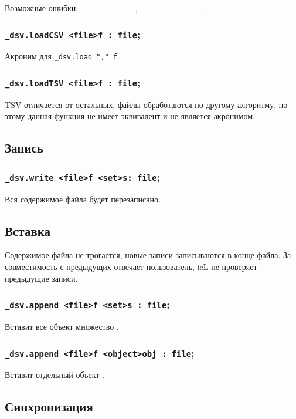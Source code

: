 \documentclass[a4paper, 14pt]{extarticle}
\newcommand{\ferror}[1]{{\fontsize{11pt}{12pt} \tt \colorbox{function}{\textcolor{white}{#1}}}}
\begin{document}
Возможные ошибки: \ferror{ParsingFailed}, \ferror{WrongDelimiter}.

\subsubsection{\lstinline|_dsv.loadCSV <file>f : file|;}

Акроним для \lstinline|_dsv.load "," f|.

\subsubsection{\lstinline|_dsv.loadTSV <file>f : file|;}

TSV отличается от остальных, файлы обработаются по другому алгоритму, по этому данная функция не имеет эквивалент и не является акронимом.

\subsection{Запись}

\subsubsection{\lstinline|_dsv.write <file>f <set>s: file|;}

Вся содержимое файла будет перезаписано.

\subsection{Вставка}

Содержимое файла не трогается, новые записи записываются в конце файла. За совместимость с предыдущих отвечает пользователь, icL не проверяет предыдущие записи.

\subsubsection{\lstinline|_dsv.append <file>f <set>s : file|;}

Вставит все объект множество .

\subsubsection{\lstinline|_dsv.append <file>f <object>obj : file|;}

Вставит отдельный объект .

\subsection{Синхронизация}
\end{document}
